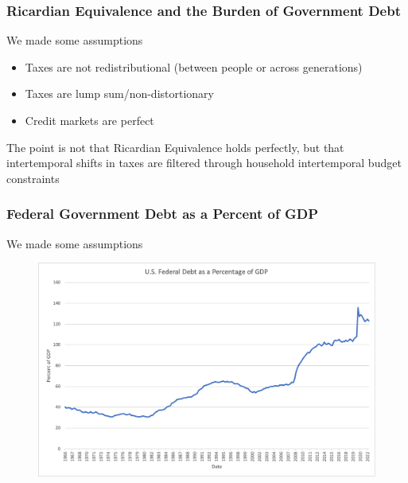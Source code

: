 \documentclass{beamer}
\begin{document}
\begin{frame}
\frametitle[alignment=center]{Ricardian Equivalence and the Burden of Government Debt}
 We made some assumptions
\begin{itemize}
\item Taxes are not redistributional (between people or across generations)
\bigskip
\item Taxes are lump sum/non-distortionary
\bigskip
\item Credit markets are perfect
\end{itemize}
The point is not that Ricardian Equivalence holds perfectly, but that intertemporal shifts in taxes are filtered through household intertemporal budget constraints
\end{frame}


\begin{frame}
\frametitle[alignment=center]{Federal Government Debt as a Percent of GDP}
 We made some assumptions
\begin{figure}
\centering
\includegraphics[scale=0.45]{Figures/FedDebt.png}
\end{figure}
\end{frame}
\end{document}
